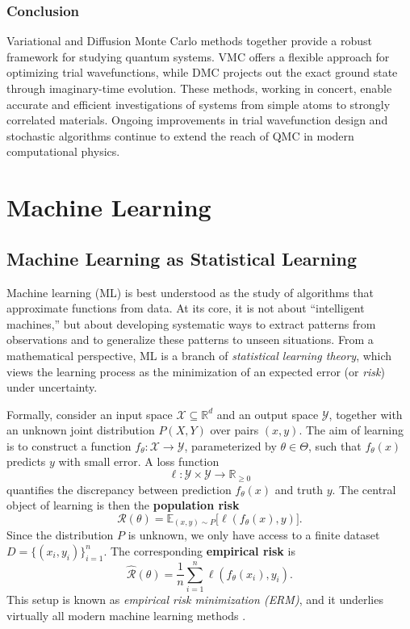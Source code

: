 \subsection{Conclusion}
Variational and Diffusion Monte Carlo methods together provide a robust framework for studying quantum systems. VMC offers a flexible approach for optimizing trial wavefunctions, while DMC projects out the exact ground state through imaginary-time evolution. These methods, working in concert, enable accurate and efficient investigations of systems from simple atoms to strongly correlated materials. Ongoing improvements in trial wavefunction design and stochastic algorithms continue to extend the reach of QMC in modern computational physics.

\chapter{Machine Learning}
\label{ch:ml_theory}

\section{Machine Learning as Statistical Learning}

Machine learning (ML) is best understood as the study of algorithms that approximate 
functions from data. At its core, it is not about ``intelligent machines,'' but about developing 
systematic ways to extract patterns from observations and to generalize these patterns to 
unseen situations. From a mathematical perspective, ML is a branch of 
\emph{statistical learning theory}, which views the learning process as the minimization 
of an expected error (or \emph{risk}) under uncertainty.  

Formally, consider an input space $\mathcal{X}\subseteq\mathbb{R}^d$ and an output 
space $\mathcal{Y}$, together with an unknown joint distribution $P(X,Y)$ over 
pairs $(x,y)$. The aim of learning is to construct a function 
$f_\theta:\mathcal{X}\to\mathcal{Y}$, parameterized by $\theta\in\Theta$, 
such that $f_\theta(x)$ predicts $y$ with small error. A loss function
\[
\ell:\mathcal{Y}\times\mathcal{Y}\to\mathbb{R}_{\geq 0}
\]
quantifies the discrepancy between prediction $f_\theta(x)$ and truth $y$. 
The central object of learning is then the \textbf{population risk}
\begin{equation}
  \mathcal{R}(\theta) = \mathbb{E}_{(x,y)\sim P}\big[\ell(f_\theta(x),y)\big].
\end{equation}
Since the distribution $P$ is unknown, we only have access to a finite dataset 
$D=\{(x_i,y_i)\}_{i=1}^n$. The corresponding \textbf{empirical risk} is
\begin{equation}
  \hat{\mathcal{R}}(\theta) = \frac{1}{n}\sum_{i=1}^n \ell(f_\theta(x_i),y_i).
\end{equation}
This setup is known as \emph{empirical risk minimization (ERM)}, and it underlies 
virtually all modern machine learning methods \cite{Berner_2022}.  

